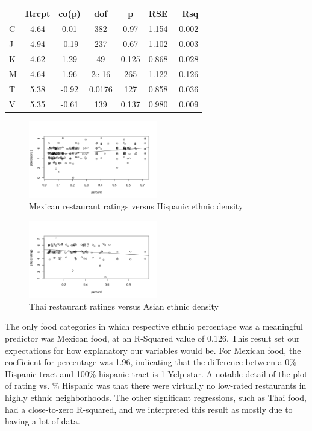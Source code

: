 \documentclass[11pt,twocolumn]{article}
\begin{document}
\begin{center}
  \begin{tabular}{| l | c | c | c | c | c | r | }
    \hline
     & Itrcpt & co(p) & dof & p & RSE & Rsq \\ \hline \hline
    C & 4.64 & 0.01 & 382 & 0.97 & 1.154 & -0.002 \\ \hline
    J & 4.94 & -0.19 & 237 & 0.67 & 1.102 & -0.003 \\ \hline
    K & 4.62 & 1.29 & 49 & 0.125 & 0.868 & 0.028 \\ \hline
    M & 4.64 & 1.96 & 2e-16 & 265 & 1.122 & 0.126 \\ \hline
    T & 5.38 & -0.92 & 0.0176 & 127 & 0.858 & 0.036 \\ \hline
    V & 5.35 & -0.61 & 139 & 0.137 & 0.980 & 0.009 \\
    \hline
  \end{tabular}
\end{center}

\begin{figure}[h!]
  \caption{Mexican restaurant ratings versus Hispanic ethnic density}
  \centering
  \includegraphics[width=0.5\textwidth]{mexican_regression}
\end{figure}

\begin{figure}[h!]
  \caption{Thai restaurant ratings versus Asian ethnic density}
  \centering
  \includegraphics[width=0.5\textwidth]{thai_regression}
\end{figure}

The only food categories in which respective ethnic percentage was a meaningful predictor was Mexican food, at an R-Squared value of 0.126. This result set our expectations for how explanatory our variables would be. For Mexican food, the coefficient for percentage was 1.96, indicating that the difference between a 0\% Hispanic tract and 100\% hispanic tract is 1 Yelp star. A notable detail of the plot of rating vs. \% Hispanic was that there were virtually no low-rated restaurants in highly ethnic neighborhoods. The other significant regressions, such as Thai food, had a close-to-zero R-squared, and we interpreted this result as mostly due to having a lot of data.
\end{document}
